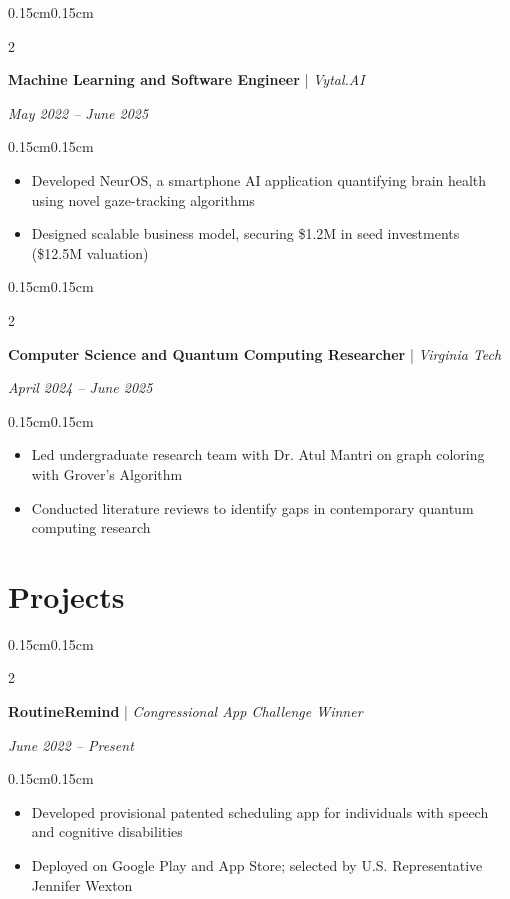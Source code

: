 \documentclass[10pt, letterpaper]{article}
\newenvironment{highlights}{
    \begin{itemize}[topsep=0pt, parsep=0pt, partopsep=0pt, itemsep=0pt, leftmargin=0.4cm]
}{
    \end{itemize}
}
\newenvironment{onecolentry}{
    \begin{adjustwidth}{0.15cm}{0.15cm}
}{
    \end{adjustwidth}
}
\newenvironment{twocolentry}[2][]{
    \onecolentry
    \def\secondColumn{#2}
    \setcolumnwidth{\fill, 4cm}
    \begin{paracol}{2}
}{
    \switchcolumn \raggedleft \secondColumn
    \end{paracol}
    \endonecolentry
}
\begin{document}
    \begin{twocolentry}{\textit{May 2022 -- June 2025}}
        \textbf{Machine Learning and Software Engineer} | \textit{Vytal.AI}
    \end{twocolentry}

    \vspace{0.05cm}
    \begin{onecolentry}
        \begin{highlights}
            \item Developed NeurOS, a smartphone AI application quantifying brain health using novel gaze-tracking algorithms
            \item Designed scalable business model, securing \$1.2M in seed investments (\$12.5M valuation)
        \end{highlights}
    \end{onecolentry}

    \vspace{0.1cm}

    \begin{twocolentry}{\textit{April 2024 -- June 2025}}
        \textbf{Computer Science and Quantum Computing Researcher} | \textit{Virginia Tech}
    \end{twocolentry}

    \vspace{0.05cm}
    \begin{onecolentry}
        \begin{highlights}
            \item Led undergraduate research team with Dr. Atul Mantri on graph coloring with Grover's Algorithm
            \item Conducted literature reviews to identify gaps in contemporary quantum computing research
        \end{highlights}
    \end{onecolentry}

    \section{Projects}

    \begin{twocolentry}{\textit{June 2022 -- Present}}
        \textbf{RoutineRemind} | \textit{Congressional App Challenge Winner}
    \end{twocolentry}

    \vspace{0.05cm}
    \begin{onecolentry}
        \begin{highlights}
            \item Developed provisional patented scheduling app for individuals with speech and cognitive disabilities
            \item Deployed on Google Play and App Store; selected by U.S. Representative Jennifer Wexton
        \end{highlights}
    \end{onecolentry}
\end{document}
